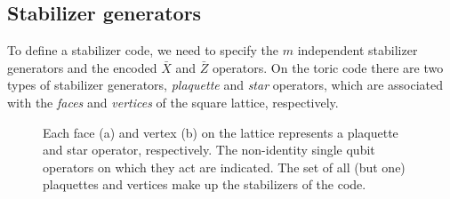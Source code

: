 \subsection{Stabilizer generators}

To define a stabilizer code, we need to specify the $m$ independent stabilizer generators and the encoded $\bar{X}$ and $\bar{Z}$ operators. On the toric code there are two types of stabilizer generators, \emph{plaquette} and \emph{star} operators, which are associated with the \emph{faces} and \emph{vertices} of the square lattice, respectively.

\begin{figure}
  \centering
  \hspace{1cm}

  \begin{center}
    \hspace{1cm}
  \end{center}

  \caption{Each face (a) and vertex (b) on the lattice represents a plaquette and star operator, respectively. The non-identity single qubit operators on which they act are indicated. The set of all (but one) plaquettes and vertices make up the stabilizers of the code. }\label{sf:fig_stabilizers}
\end{figure}

